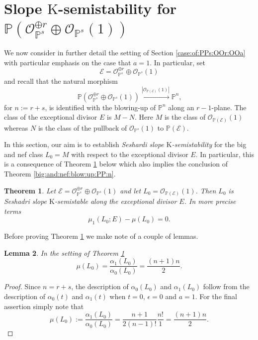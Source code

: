 \documentclass[10pt,letterpaper]{amsart}
\newcommand{\Osh}{{\mathcal O}}                        %
\newcommand{\K}{\mathrm{K}}
\newcommand{\PP}{\mathbb{P}} %
\newtheorem{theorem}{Theorem}[section]
\newtheorem{lemma}[theorem]{Lemma}
\theoremstyle{definition}
\numberwithin{equation}{section}
\begin{document}
\section{Slope $\K$-semistability for  $\PP(\Osh_{\PP^s}^{\oplus r} \oplus \Osh_{\PP^s}(1))$}\label{Case:of:OOr:OO1}

We now consider in further detail the setting of Section \ref{case:of:PPs:OOr:OOa} with particular emphasis on the case that $a = 1$.   In particular, set 
$$
\mathcal{E} = \Osh_{\PP^s}^{\oplus r} \oplus \Osh_{\PP^s}(1) 
$$
and recall that the natural morphism
$$
\PP(\Osh_{\PP^s}^{\oplus r} \oplus \Osh_{\PP^s}(1)) \xrightarrow{|\Osh_{\PP(\mathcal{E})}(1)|} \PP^n\text{,} 
$$
for $n := r + s$, is identified with the blowing-up of $\PP^n$ along an $r-1$-plane.  
The class of the exceptional divisor $E$ is $M - N$.  Here $M$ is the class of $\Osh_{\PP(\mathcal{E})}(1)$ whereas $N$ is the class of the pullback of $\Osh_{\PP^s}(1)$ to $\PP(\mathcal{E})$.

In this section, our aim is to establish \emph{Seshardi slope $\K$-semistability} for the big and nef class $L_0 = M$ with respect to the exceptional divisor $E$.  In particular, this is a consequence of Theorem \ref{instability:main:thm} below which also implies the conclusion of Theorem \ref{big:and:nef:blow:up:PP:n}.

\begin{theorem}\label{instability:main:thm}
Let $\mathcal{E} = \Osh_{\PP^s}^{\oplus r} \oplus \Osh_{\PP^s}(1)$ and let $L_0 = \Osh_{\PP(\mathcal{E})}(1)$.  Then $L_0$ is Seshadri slope $\K$-semistable along the exceptional divisor $E$.  In more precise terms
\begin{equation}\label{slope:stab:key:eqn}
\mu_1(L_0;E) - \mu(L_0) = 0 \text{.}
\end{equation}
\end{theorem}

Before proving Theorem \ref{instability:main:thm} we make note of a couple of lemmas.  

\begin{lemma}\label{epsilon:zero:big:nef:slope:a0}
In the setting of Theorem \ref{instability:main:thm}
$$
\mu(L_0) = \frac{\alpha_1(L_0)}{\alpha_0(L_0)} = \frac{(n+1)n}{2} \text{.}
$$
\end{lemma}

\begin{proof}
Since $n = r + s$, the description of $\alpha_0(L_0)$ and $\alpha_1(L_0)$ follow from the description of $\alpha_0(t)$ and $\alpha_1(t)$ when $t = 0$, $\epsilon = 0$ and $a = 1$. 
For the final assertion simply note that
$$
\mu(L_0) := \frac{\alpha_1(L_0)}{\alpha_0(L_0)} = \frac{n+1}{2(n-1)!} \frac{n!}{1} = \frac{(n+1)n}{2} \text{.}
$$
\end{proof}
\end{document}
